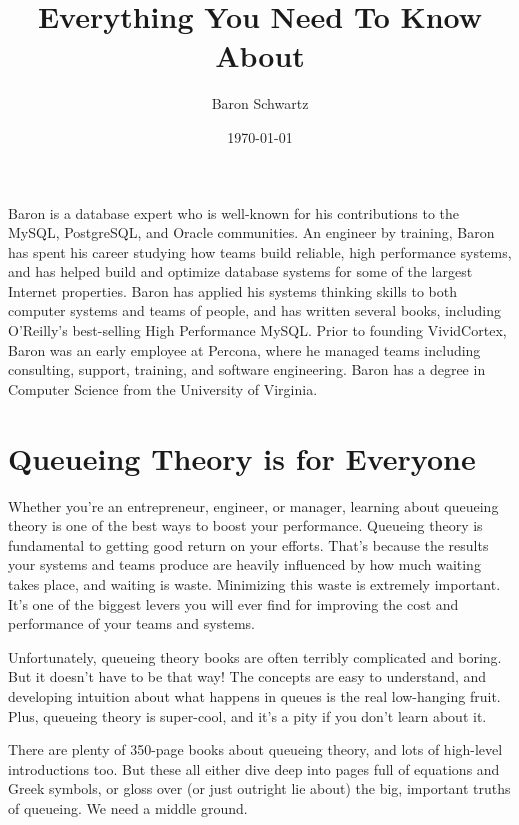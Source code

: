\documentclass{vivid_layout_pdf}
\title{Everything You Need To Know About}{Queueing Theory}
\date{\today}
\author{Baron Schwartz}{author_image}
\begin{document}
\maketitle		%
\begin{bio}		%
Baron is a database expert who is well-known for his contributions to the MySQL, PostgreSQL, and Oracle communities. An engineer by training, Baron has spent his career studying how teams build reliable, high performance systems, and has helped build and optimize database systems for some of the largest Internet properties. Baron has applied his systems thinking skills to both computer systems and teams of people, and has written several books, including O'Reilly's best-selling High Performance MySQL. Prior to founding VividCortex, Baron was an early employee at Percona, where he managed teams including consulting, support, training, and software engineering. Baron has a degree in Computer Science from the University of Virginia.
\end{bio}
\tableofcontents	%

\section{Queueing Theory is for Everyone}

Whether you're an entrepreneur, engineer, or manager, learning about queueing theory is one of the best ways to boost your performance. Queueing theory is fundamental to getting good return on your efforts. That's because the results your systems and teams produce are heavily influenced by how much waiting takes place, and waiting is waste. Minimizing this waste is extremely important. It's one of the biggest levers you will ever find for improving the cost and performance of your teams and systems.

Unfortunately, queueing theory books are often terribly complicated and boring. But it doesn't have to be that way! The concepts are easy to understand, and developing intuition about what happens in queues is the real low-hanging fruit. Plus, queueing theory is super-cool, and it's a pity if you don't learn about it.

There are plenty of 350-page books about queueing theory, and lots of high-level introductions too. But these all either dive deep into pages full of equations and Greek symbols, or gloss over (or just outright lie about) the big, important truths of queueing. We need a middle ground.
\end{document}
